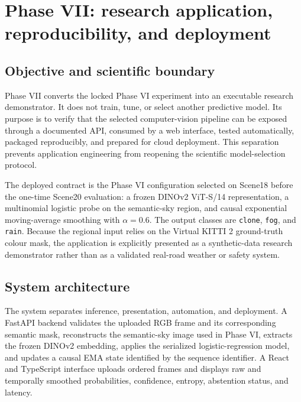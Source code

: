 
\section{Phase VII: research application, reproducibility, and deployment}
\label{sec:phase7}

\subsection{Objective and scientific boundary}

Phase VII converts the locked Phase VI experiment into an executable research
demonstrator. It does not train, tune, or select another predictive model. Its purpose is
to verify that the selected computer-vision pipeline can be exposed through a documented
API, consumed by a web interface, tested automatically, packaged reproducibly, and prepared
for cloud deployment. This separation prevents application engineering from reopening the
scientific model-selection protocol.

The deployed contract is the Phase VI configuration selected on Scene18 before the one-time
Scene20 evaluation: a frozen DINOv2 ViT-S/14 representation, a multinomial logistic probe on
the semantic-sky region, and causal exponential moving-average smoothing with
$\alpha=0.6$. The output classes are \texttt{clone}, \texttt{fog}, and \texttt{rain}.
Because the regional input relies on the Virtual KITTI 2 ground-truth colour mask, the
application is explicitly presented as a synthetic-data research demonstrator rather than
as a validated real-road weather or safety system.

\subsection{System architecture}

The system separates inference, presentation, automation, and deployment. A FastAPI
backend validates the uploaded RGB frame and its corresponding semantic mask, reconstructs
the semantic-sky image used in Phase VI, extracts the frozen DINOv2 embedding, applies the
serialized logistic-regression model, and updates a causal EMA state identified by the
sequence identifier. A React and TypeScript interface uploads ordered frames and displays
raw and temporally smoothed probabilities, confidence, entropy, abstention status, and
latency.

